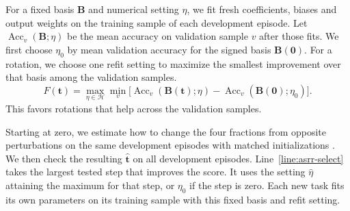 For a fixed basis $\mathbf B$ and numerical setting $\eta$,
we fit fresh coefficients, biases and output weights on the training
sample of each development episode. Let
$\operatorname{Acc}_v(\mathbf B;\eta)$ be the mean accuracy on
validation sample $v$ after those fits. We first choose $\eta_0$ by
mean validation accuracy for the signed basis $\mathbf B(\mathbf 0)$.
For a rotation, we choose one refit setting to maximize the smallest
improvement over that basis among the validation samples.
\begin{equation}
    F(\mathbf t)=\max_{\eta\in\mathcal H}\min_v
        \bigl[\operatorname{Acc}_v(\mathbf B(\mathbf t);\eta)
            -\operatorname{Acc}_v(\mathbf B(\mathbf0);\eta_0)\bigr].
    \label{eq:method-structure-selection}
\end{equation}
This favors rotations that help across the validation samples.

Starting at zero, we estimate how to change the four fractions from
opposite perturbations on the same development episodes with matched
initializations \citep{spall1992simultaneous}. We then check the
resulting $\widehat{\mathbf t}$ on all development episodes.
Line~\ref{line:asrr-select} takes the largest tested step that improves the
score. It uses the setting $\widehat\eta$ attaining the maximum for
that step, or $\eta_0$ if the step is zero. Each new task fits its own
parameters on its training sample with this fixed basis and refit setting.
